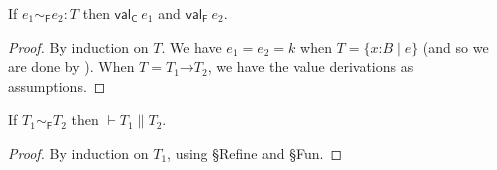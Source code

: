 \documentclass[9pt]{extarticle}
\newcommand{\ottnt}[1]{\mathit{#1}}
\newcommand{\ottsym}[1]{#1}
\begin{document}
{{\iffull
\begin{lemma}
  \label{lem:forgetfullrvalue}
  If $ \ottnt{e_{{\mathrm{1}}}}   \sim _{  \mathsf{F}  }  \ottnt{e_{{\mathrm{2}}}}  :  \ottnt{T} $ then $ \mathsf{val} _{  \mathsf{C}  }~ \ottnt{e_{{\mathrm{1}}}} $ and $ \mathsf{val} _{  \mathsf{F}  }~ \ottnt{e_{{\mathrm{2}}}} $.
\begin{proof}
    By induction on $\ottnt{T}$. We have $\ottnt{e_{{\mathrm{1}}}}  \ottsym{=}  \ottnt{e_{{\mathrm{2}}}} = \ottnt{k}$ when $\ottnt{T}  \ottsym{=}   \{ \mathit{x} \mathord{:} \ottnt{B} \mathrel{\mid} \ottnt{e} \} $ (and so we are done by ). When $\ottnt{T}  \ottsym{=}   \ottnt{T_{{\mathrm{1}}}} \mathord{ \rightarrow } \ottnt{T_{{\mathrm{2}}}} $, we have the value derivations as assumptions.
  \end{proof}  
\end{lemma}

\begin{lemma}
  \label{lem:forgetfullrsimilar}
  If $ \ottnt{T_{{\mathrm{1}}}}   \sim _{  \mathsf{F}  }  \ottnt{T_{{\mathrm{2}}}} $ then $\vdash  \ottnt{T_{{\mathrm{1}}}}  \mathrel{\parallel}  \ottnt{T_{{\mathrm{2}}}}$.
\begin{proof}
    By induction on $\ottnt{T_{{\mathrm{1}}}}$, using \S{Refine} and \S{Fun}.
  \end{proof}
\end{lemma}
\fi}

}
\end{document}
